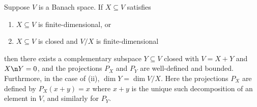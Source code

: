 \documentclass[12pt]{article}
\begin{document}
\begin{lem}\label{compl}Suppose $V$ is a Banach space. If $X \subseteq V$ satisfies
\begin{enumerate}[label = (\roman*)]
\item  $X \subseteq V$ is finite-dimensional, or
\item $X \subseteq V$ is closed and $V/X$ is finite-dimensional
\end{enumerate}
then there exists a complementary subspace $Y \subseteq V$ closed with $V = X+Y$ and $X\n Y = 0$, and the projections $P_X$ and $P_Y$ are well-defined and bounded. Furthrmore, in the case of (ii), $\dim Y  = \dim V/X$. Here the projections $P_X$ are defined by $P_X(x+y) = x$ where $x+y$ is the unique such decomposition of an element in $V$, and similarly for $P_Y$.\end{lem}
\end{document}
